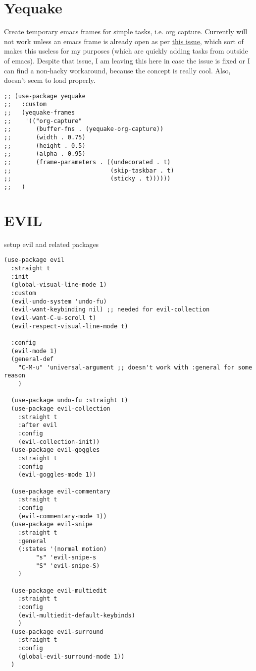 \documentclass[11pt]{article}
\begin{document}
\section{Yequake}
\label{sec:orgb66d721}
Create temporary emacs frames for simple tasks, i.e. org capture.
Currently will not work unless an emacs frame is already open as per \href{https://github.com/alphapapa/yequake/issues/2}{this issue}, which sort of makes this useless for my purposes (which are quickly adding tasks from outside of emacs).
Despite that issue, I am leaving this here in case the issue is fixed or I can find a non-hacky workaround, because the concept is really cool.
Also, doesn't seem to load properly.
\begin{verbatim}
;; (use-package yequake
;;   :custom
;;   (yequake-frames
;;    '(("org-capture" 
;;       (buffer-fns . (yequake-org-capture))
;;       (width . 0.75)
;;       (height . 0.5)
;;       (alpha . 0.95)
;;       (frame-parameters . ((undecorated . t)
;;                            (skip-taskbar . t)
;;                            (sticky . t))))))
;;   )
\end{verbatim}
\section{EVIL}
\label{sec:org3544cd1}
setup evil and related packages
\begin{verbatim}
(use-package evil
  :straight t
  :init
  (global-visual-line-mode 1)
  :custom
  (evil-undo-system 'undo-fu)
  (evil-want-keybinding nil) ;; needed for evil-collection
  (evil-want-C-u-scroll t)
  (evil-respect-visual-line-mode t)

  :config
  (evil-mode 1)
  (general-def
    "C-M-u" 'universal-argument ;; doesn't work with :general for some reason
    )

  (use-package undo-fu :straight t)
  (use-package evil-collection
    :straight t
    :after evil
    :config
    (evil-collection-init))
  (use-package evil-goggles
    :straight t
    :config
    (evil-goggles-mode 1))

  (use-package evil-commentary
    :straight t
    :config
    (evil-commentary-mode 1))
  (use-package evil-snipe
    :straight t
    :general
    (:states '(normal motion)
	     "s" 'evil-snipe-s
	     "S" 'evil-snipe-S)
    )

  (use-package evil-multiedit
    :straight t
    :config
    (evil-multiedit-default-keybinds)
    )
  (use-package evil-surround
    :straight t
    :config
    (global-evil-surround-mode 1))
  )
\end{verbatim}
\end{document}
